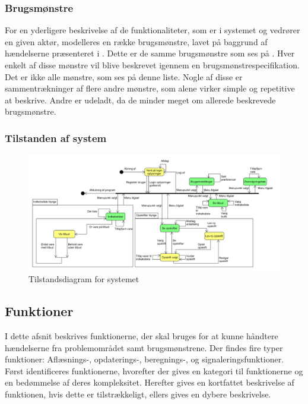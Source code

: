\subsubsection{Brugsmønstre}
For en yderligere beskrivelse af de funktionaliteter, som er i systemet og vedrører en given aktør, modelleres en række brugsmønstre, lavet på baggrund af hændelserne præsenteret i .
Dette er de samme brugsmønstre som ses på .
Hver enkelt af disse mønstre vil blive beskrevet igennem en brugsmønstrespecifikation.
Det er ikke alle mønstre, som ses på denne liste.
Nogle af disse er sammentrækninger af flere andre mønstre, som alene virker simple og repetitive at beskrive.
Andre er udeladt, da de minder meget om allerede beskrevede brugsmønstre.



\subsubsection{Tilstanden af system}
\begin{figure}
	\centering
	\includegraphics[trim=0cm 0cm 0cm 0cm, clip, scale=0.50, angle=90]{images/Diagrams/Tilstandsdiagram.PNG} %
	\caption{Tilstandsdiagram for systemet}\label{tilstandsdiagram}
\end{figure}



\subsection{Funktioner}\label{subsec:funktioner}

I dette afsnit beskrives funktionerne, der skal bruges for at kunne håndtere hændelserne fra problemområdet samt brugsmønstrene.
Der findes fire typer funktioner: Aflæsnings-, opdaterings-, beregnings-, og signaleringsfunktioner.\citep{OOA&D2001}
Først identificeres funktionerne, hvorefter der gives en kategori til funktionerne og en bedømmelse af deres kompleksitet. 
Herefter gives en kortfattet beskrivelse af funktionen, hvis dette er tilstrækkeligt, ellers gives en dybere beskrivelse.

